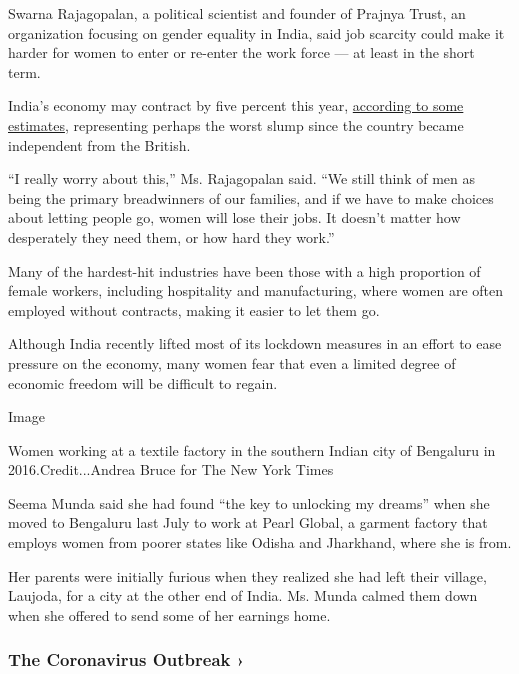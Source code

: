 Swarna Rajagopalan, a political scientist and founder of Prajnya Trust,
an organization focusing on gender equality in India, said job scarcity
could make it harder for women to enter or re-enter the work force ---
at least in the short term.

India's economy may contract by five percent this year,
\href{https://www.crisil.com/en/home/our-analysis/reports/2020/05/minus-five.html}{according
to some estimates}, representing perhaps the worst slump since the
country became independent from the British.

``I really worry about this,'' Ms. Rajagopalan said. ``We still think of
men as being the primary breadwinners of our families, and if we have to
make choices about letting people go, women will lose their jobs. It
doesn't matter how desperately they need them, or how hard they work.''

Many of the hardest-hit industries have been those with a high
proportion of female workers, including hospitality and manufacturing,
where women are often employed without contracts, making it easier to
let them go.

Although India recently lifted most of its lockdown measures in an
effort to ease pressure on the economy, many women fear that even a
limited degree of economic freedom will be difficult to regain.

Image

Women working at a textile factory in the southern Indian city of
Bengaluru in 2016.Credit...Andrea Bruce for The New York Times

Seema Munda said she had found ``the key to unlocking my dreams'' when
she moved to Bengaluru last July to work at Pearl Global, a garment
factory that employs women from poorer states like Odisha and Jharkhand,
where she is from.

Her parents were initially furious when they realized she had left their
village, Laujoda, for a city at the other end of India. Ms. Munda calmed
them down when she offered to send some of her earnings home.

\href{https://www.nytimes.com/news-event/coronavirus?action=click\&pgtype=Article\&state=default\&region=MAIN_CONTENT_3\&context=storylines_faq}{}

\hypertarget{the-coronavirus-outbreak-}{%
\subsubsection{The Coronavirus Outbreak
›}\label{the-coronavirus-outbreak-}}

